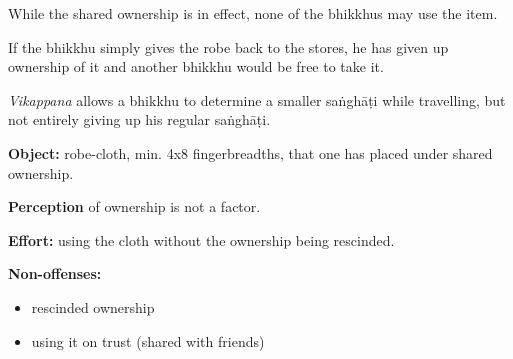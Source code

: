 While the shared ownership is in effect, none of the bhikkhus may use
the item.

If the bhikkhu simply gives the robe back to the stores, he has given up
ownership of it and another bhikkhu would be free to take it.

\emph{Vikappana} allows a bhikkhu to determine a smaller saṅghāṭi while
travelling, but not entirely giving up his regular saṅghāṭi.

\textbf{Object:} robe-cloth, min. 4x8 fingerbreadths, that one has
placed under shared ownership.

\textbf{Perception} of ownership is not a factor.

\textbf{Effort:} using the cloth without the ownership being rescinded.

\textbf{Non-offenses:}

\begin{itemize}
\tightlist
\item
  rescinded ownership
\item
  using it on trust (shared with friends)
\end{itemize}

